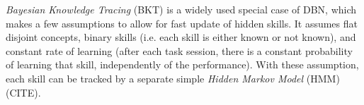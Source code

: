


\emph{Bayesian Knowledge Tracing} (BKT) \cite{bkt} %
is a widely used special case of DBN, which makes a few assumptions to allow
for fast update of hidden skills. %
It assumes flat disjoint concepts, binary skills (i.e. each skill is either
known or not known), and constant rate of learning (after each task session, there
is a constant probability of learning that skill, independently of the
performance).
With these assumption, each skill can be tracked by a separate simple
\emph{Hidden Markov Model} (HMM) (CITE).

